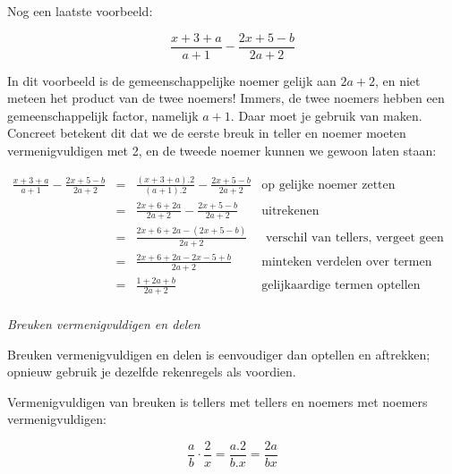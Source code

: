 	
	\begin{voorbeeld}
		Nog een laatste voorbeeld:
	
	\begin{equation*}
	{\displaystyle \frac{x+3+a}{a+1}-\frac{2x+5-b}{2a+2}}
	\end{equation*}
	
	In dit voorbeeld is de gemeenschappelijke noemer gelijk
	aan $2a+2$, en niet meteen het product van de twee noemers! Immers,
	de twee noemers hebben een gemeenschappelijk factor, namelijk $a+1$.
	Daar moet je gebruik van maken. Concreet betekent dit dat we de eerste
	breuk in teller en noemer moeten vermenigvuldigen met 2, en de tweede
	noemer kunnen we gewoon laten staan:
	
	\begin{math}
	\begin{array}{ccl|r}
	{\displaystyle \frac{x+3+a}{a+1}-\frac{2x+5-b}{2a+2}} & = & {\displaystyle \frac{(x+3+a).2}{(a+1).2}-\frac{2x+5-b}{2a+2}}  & \text{op gelijke noemer zetten}\\
	& = & {\displaystyle \frac{2x+6+2a}{2a+2}-\frac{2x+5-b}{2a+2}} &\text{uitrekenen}\\
	& = & {\displaystyle \frac{2x+6+2a-(2x+5-b)}{2a+2}} & \text{ verschil van tellers, vergeet geen haken!}\\
	& = & {\displaystyle \frac{2x+6+2a-2x-5+b}{2a+2}} & \text{minteken verdelen over termen}\\
	& = & {\displaystyle \frac{1+2a+b}{2a+2}} & \text{gelijkaardige termen optellen}\\
	\end{array}
	\end{math}

	\end{voorbeeld}	
	
	\emph{Breuken vermenigvuldigen en delen}
	
	Breuken vermenigvuldigen en delen is eenvoudiger dan optellen en aftrekken;
	opnieuw gebruik je dezelfde rekenregels als voordien. 
	
	\begin{voorbeeld}
		Vermenigvuldigen van breuken is tellers met tellers en noemers
	met noemers vermenigvuldigen:
	
	\begin{equation*}
		{\displaystyle \frac{a}{b}\cdot\frac{2}{x}=\frac{a.2}{b.x}=\frac{2a}{bx}} 
	\end{equation*}
	
	\end{voorbeeld}
	
